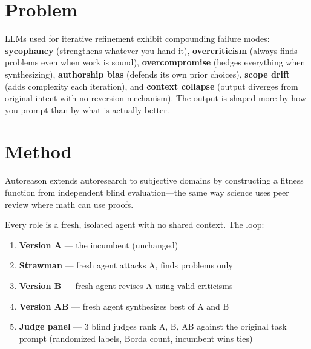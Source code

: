 \documentclass[10pt,twocolumn]{article}
\begin{document}

\section{Problem}

LLMs used for iterative refinement exhibit compounding failure modes: \textbf{sycophancy} (strengthens whatever you hand it), \textbf{overcriticism} (always finds problems even when work is sound), \textbf{overcompromise} (hedges everything when synthesizing), \textbf{authorship bias} (defends its own prior choices), \textbf{scope drift} (adds complexity each iteration), and \textbf{context collapse} (output diverges from original intent with no reversion mechanism). The output is shaped more by how you prompt than by what is actually better.

\section{Method}

Autoreason extends autoresearch to subjective domains by constructing a fitness function from independent blind evaluation---the same way science uses peer review where math can use proofs.

Every role is a fresh, isolated agent with no shared context. The loop:

\begin{enumerate}
\item \textbf{Version A} --- the incumbent (unchanged)
\item \textbf{Strawman} --- fresh agent attacks A, finds problems only
\item \textbf{Version B} --- fresh agent revises A using valid criticisms
\item \textbf{Version AB} --- fresh agent synthesizes best of A and B
\item \textbf{Judge panel} --- 3 blind judges rank A, B, AB against the original task prompt (randomized labels, Borda count, incumbent wins ties)
\end{enumerate}
\end{document}
